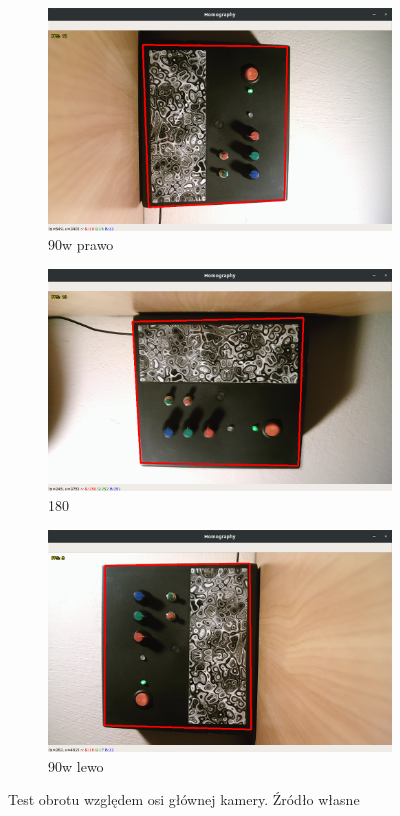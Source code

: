 \documentclass[12pt,twoside,polish]{article}
\begin{document}
\begin{figure}[htb!]
	\begin{subfigure}[b]{0.5\textwidth}
		\includegraphics[width=\textwidth]{test_rot1}
		\caption{90\degree w prawo}
		\label{test_rot1}
	\end{subfigure}
	\begin{subfigure}[b]{0.5\textwidth}
		\includegraphics[width=\textwidth]{test_rot2}
		\caption{180\degree}
		\label{test_rot2}
	\end{subfigure}
	\begin{subfigure}[b]{0.5\textwidth}
		\includegraphics[width=\textwidth]{test_rot3}
		\caption{90\degree w lewo}
		\label{test_rot3}
	\end{subfigure}
	\caption{Test obrotu względem osi głównej kamery. Źródło własne}
\end{figure}
\FloatBarrier
\end{document}
